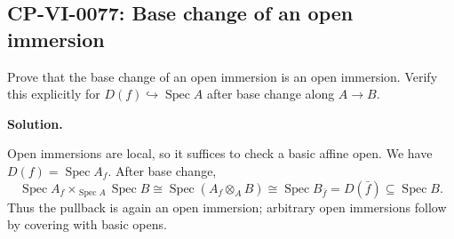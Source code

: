 
\subsection*{CP-VI-0077: Base change of an open immersion}

Prove that the base change of an open immersion is an open immersion. Verify this explicitly for $D(f)\hookrightarrow\operatorname{Spec}A$ after base change along $A\to B$.

\medskip
\noindent\textbf{Solution.}

Open immersions are local, so it suffices to check a basic affine open. We have $D(f)=\operatorname{Spec}A_f$. After base change,
\[
\operatorname{Spec}A_f\times_{\operatorname{Spec}A}\operatorname{Spec}B
\cong\operatorname{Spec}(A_f\otimes_A B)
\cong\operatorname{Spec}B_{\bar f}=D(\bar f)\subseteq\operatorname{Spec}B.
\]
Thus the pullback is again an open immersion; arbitrary open immersions follow by covering with basic opens.
